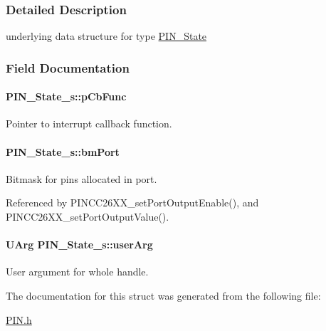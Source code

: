 \subsubsection{Detailed Description}
underlying data structure for type \hyperlink{_p_i_n_8h_a36ef69d50df6baa6973482669c24a522}{P\+I\+N\+\_\+\+State} 

\subsubsection{Field Documentation}
\paragraph[{p\+Cb\+Func}]{ P\+I\+N\+\_\+\+State\+\_\+s\+::p\+Cb\+Func}\label{struct_p_i_n___state__s_a4cae3c3e38b67189531fa4e467b49b2d}


Pointer to interrupt callback function. 

\paragraph[{bm\+Port}]{ P\+I\+N\+\_\+\+State\+\_\+s\+::bm\+Port}\label{struct_p_i_n___state__s_a28cbcd4b8adc0ddbbc14a83cd272574b}


Bitmask for pins allocated in port. 



Referenced by P\+I\+N\+C\+C26\+X\+X\+\_\+set\+Port\+Output\+Enable(), and P\+I\+N\+C\+C26\+X\+X\+\_\+set\+Port\+Output\+Value().

\paragraph[{user\+Arg}]{\setlength{\rightskip}{0pt plus 5cm}U\+Arg P\+I\+N\+\_\+\+State\+\_\+s\+::user\+Arg}\label{struct_p_i_n___state__s_ad999027739394724e799929859d6a61e}


User argument for whole handle. 



The documentation for this struct was generated from the following file\+:\begin{DoxyCompactItemize}
\item 
\hyperlink{_p_i_n_8h}{P\+I\+N.\+h}\end{DoxyCompactItemize}
